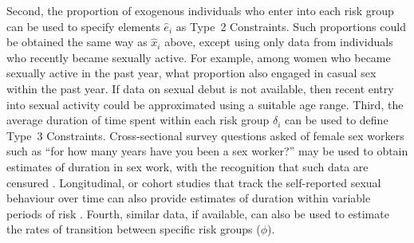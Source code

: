 Second, the proportion of exogenous individuals who enter into each risk group
can be used to specify elements $\hat{e}_i$ as Type~2 Constraints.
Such proportions could be obtained the same way as $\hat{x}_i$ above,
except using only data from individuals who recently became sexually active.
For example, among women who became sexually active in the past year,
what proportion also engaged in casual sex within the past year.
If data on sexual debut is not available,
then recent entry into sexual activity could be approximated using
a suitable age range.
Third, the average duration of time spent within each risk group $\delta_i$
can be used to define Type~3 Constraints.
Cross-sectional survey questions asked of female sex workers such as	
``for how many years have you been a sex worker?''
may be used to obtain estimates of duration in sex work,
with the recognition that such data are censured \citep{Watts2010}.
Longitudinal, or cohort studies
that track the self-reported sexual behaviour over time can also provide 
estimates of duration within variable periods of risk \citep{Fergus2007}.
Fourth, similar data, if available, can also be used to estimate
the rates of transition between specific risk groups ($\phi$).
